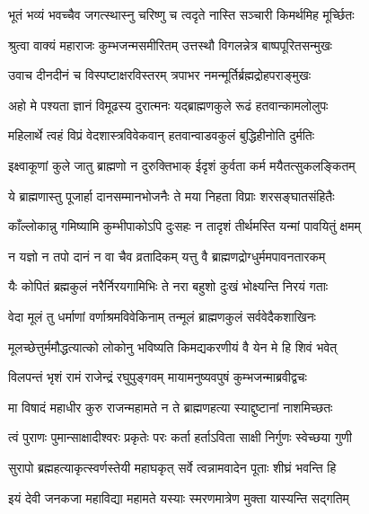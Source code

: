 \twolineshloka
{भूतं भव्यं भवच्चैव जगत्स्थास्नु चरिष्णु च}
{त्वदृते नास्ति सञ्चारी किमर्थमिह मूर्च्छितः}%

\twolineshloka
{श्रुत्वा वाक्यं महाराजः कुम्भजन्मसमीरितम्}
{उत्तस्थौ विगलन्नेत्र बाष्पपूरितसन्मुखः}%

\twolineshloka
{उवाच दीनदीनं च विस्पष्टाक्षरविस्तरम्}
{त्रपाभर नमन्मूर्तिर्ब्रह्मद्रोहपराङ्मुखः}%


\twolineshloka
{अहो मे पश्यता ज्ञानं विमूढस्य दुरात्मनः}
{यद्ब्राह्मणकुले रूढं हतवान्कामलोलुपः}%

\twolineshloka
{महिलार्थे त्वहं विप्रं वेदशास्त्रविवेकवान्}
{हतवान्वाडवकुलं बुद्धिहीनोति दुर्मतिः}%

\twolineshloka
{इक्ष्वाकूणां कुले जातु ब्राह्मणो न दुरुक्तिभाक्}
{ईदृशं कुर्वता कर्म मयैतत्सुकलङ्कितम्}%

\twolineshloka
{ये ब्राह्मणास्तु पूजार्हा दानसम्मानभोजनैः}
{ते मया निहता विप्राः शरसङ्घातसंहितैः}%

\twolineshloka
{काँल्लोकान्नु गमिष्यामि कुम्भीपाकोऽपि दुःसहः}
{न तादृशं तीर्थमस्ति यन्मां पावयितुं क्षमम्}%

\twolineshloka
{न यज्ञो न तपो दानं न वा चैव व्रतादिकम्}
{यत्तु वै ब्राह्मणद्रोग्धुर्ममपावनतारकम्}%

\twolineshloka
{यैः कोपितं ब्रह्मकुलं नरैर्निरयगामिभिः}
{ते नरा बहुशो दुःखं भोक्ष्यन्ति निरयं गताः}%

\twolineshloka
{वेदा मूलं तु धर्माणां वर्णाश्रमविवेकिनाम्}
{तन्मूलं ब्राह्मणकुलं सर्ववेदैकशाखिनः}%

\twolineshloka
{मूलच्छेत्तुर्ममौद्धत्यात्को लोकोनु भविष्यति}
{किमद्यकरणीयं वै येन मे हि शिवं भवेत्}%


\twolineshloka
{विलपन्तं भृशं रामं राजेन्द्रं रघुपुङ्गवम्}
{मायामनुष्यवपुषं कुम्भजन्माब्रवीद्वचः}%


\twolineshloka
{मा विषादं महाधीर कुरु राजन्महामते}
{न ते ब्राह्मणहत्या स्याद्दुष्टानां नाशमिच्छतः}%

\twolineshloka
{त्वं पुराणः पुमान्साक्षादीश्वरः प्रकृतेः परः}
{कर्ता हर्ताऽविता साक्षी निर्गुणः स्वेच्छया गुणी}%

\twolineshloka
{सुरापो ब्रह्महत्याकृत्स्वर्णस्तेयी महाघकृत्}
{सर्वे त्वन्नामवादेन पूताः शीघ्रं भवन्ति हि}%

\twolineshloka
{इयं देवी जनकजा महाविद्या महामते}
{यस्याः स्मरणमात्रेण मुक्ता यास्यन्ति सद्गतिम्}%

